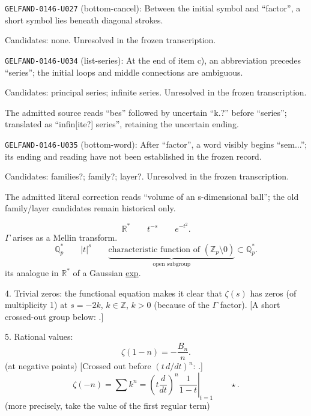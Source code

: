 \noindent\texttt{GELFAND-0146-U027} (bottom-cancel): Between the initial symbol and “factor”, a short symbol lies beneath diagonal strokes.\par
Candidates: none. Unresolved in the frozen transcription.\par
\noindent\texttt{GELFAND-0146-U034} (list-series): At the end of item c), an abbreviation precedes “series”; the initial loops and middle connections are ambiguous.\par
Candidates: principal series; infinite series. Unresolved in the frozen transcription.\par
The admitted source reads “bes” followed by uncertain “k.?” before “series”; translated as “infin[ite?] series”, retaining the uncertain ending.\par
\noindent\texttt{GELFAND-0146-U035} (bottom-word): After “factor”, a word visibly begins “sem...”; its ending and reading have not been established in the frozen record.\par
Candidates: families?; family?; layer?. Unresolved in the frozen transcription.\par
The admitted literal correction reads “volume of an s-dimensional ball”; the old family/layer candidates remain historical only.\par


\begin{equation*}
\mathbb R^*\qquad t^{-s}\qquad e^{-t^2}.
\end{equation*}
$\Gamma$ arises as a Mellin transform.
\begin{equation*}
\mathbb Q_p^*\qquad |t|^s\qquad\underbrace{\text{characteristic function of }(\mathbb Z_p\setminus0)}_{\text{open subgroup}}\subset\mathbb Q_p^*.
\end{equation*}
its analogue in $\mathbb R^*$  of a Gaussian \underline{exp}.

4. Trivial zeros: the functional equation makes it clear that $\zeta(s)$ has zeros
(of multiplicity 1) at $s=-2k$, $k\in\mathbb Z$, $k>0$ (because of the $\Gamma$ factor).
[A short crossed-out group below: .]

5. Rational values:
\begin{equation*}
\zeta(1-n)=-\frac{B_n}{n}.
\end{equation*}
(at negative points)
[Crossed out before $(t\,d/dt)^n$: .]
\begin{equation*}
\zeta(-n)=\sum k^n=\left.\left(t\frac d{dt}\right)^n\frac1{1-t}\right|_{t=1}\qquad\star.
\end{equation*}
(more precisely, take the value of the first regular term)

